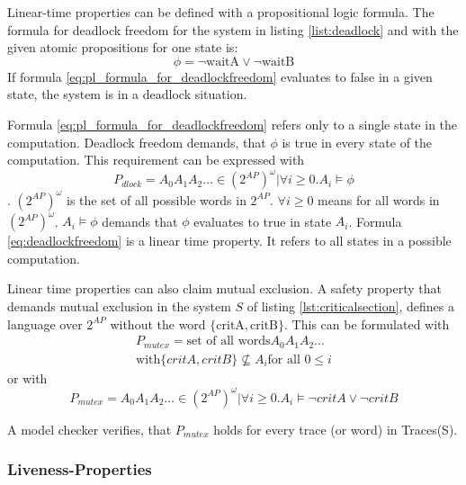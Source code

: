 \documentclass[12pt,a4paper,twoside]{article}
\begin{document}
Linear-time properties can be defined with a propositional logic formula. The formula for deadlock freedom for the system in listing \ref{list:deadlock} and with the given atomic propositions for one state is:
\begin{equation}
  \label{eq:pl_formula_for_deadlockfreedom}
\phi = \neg \text{waitA} \lor \neg \text{waitB}  
\end{equation}
If formula \ref{eq:pl_formula_for_deadlockfreedom} evaluates to false in a given state, the system is in a deadlock situation. 


Formula \ref{eq:pl_formula_for_deadlockfreedom} refers only to a single state in the computation. Deadlock freedom demands, that $\phi$ is true in every state of the computation. This requirement can be expressed with
\begin{equation}
  \label{eq:deadlockfreedom}
  P_{dlock} = {A_0 A_1 A_2 \dots \in (2^{AP})^{\omega} | \forall i \geq 0.   A_i \models \phi}
\end{equation}
. $(2^{AP})^{\omega}$ is the set of all possible words in $2^{AP}$. $ \forall i \geq 0$ means for all words in $(2^{AP})^{\omega}$. $A_i \models \phi$ demands that $\phi$ evaluates to true in state $A_i$.
Formula \ref{eq:deadlockfreedom} is a linear time property. It refers to all states in a possible computation. 

Linear time properties can also claim mutual exclusion. A safety property that demands mutual exclusion in the system $S$ of listing \ref{lst:criticalsection}, defines a language over $2^{AP}$ without the word $\{\text{critA},\text{critB}\}$. This can be formulated with
\begin{multline}
  \label{eq:mutexinwords}
  P_{mutex} = \text{set of all words} A_0 A_1 A_2 \dots \\ \text{with} \{critA,critB\} \not \subseteq A_i \text{for all } 0 \leq i
\end{multline}
or with
\begin{equation}
  \label{eq:mutex}
P_{mutex}   = {A_0 A_1 A_2 \dots \in (2^{AP})^{\omega} | \forall i \geq 0.   A_i \models \neg critA \lor \neg critB}
\end{equation}

A model checker verifies, that $P_{mutex}$ holds for every trace (or word) in Tra\-ces(S).

\subsubsection{Liveness-Properties}
\label{sec:liveness}
\end{document}
